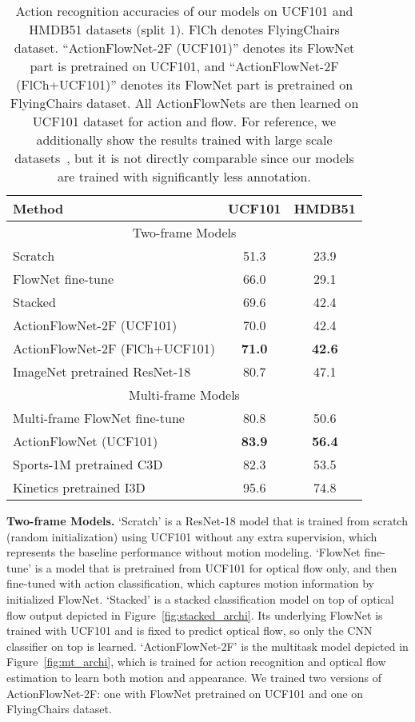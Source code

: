 \documentclass[10pt,twocolumn,letterpaper]{article}
\begin{document}
\begin{table}[h!]
\begin{center}{\small
    \begin{tabular}{l|c|c}
    \hline
    Method & UCF101 & HMDB51\\
    \hline\hline
      \multicolumn{3}{c}{Two-frame Models} \\
      \hline
    Scratch & 51.3 & 23.9 \\
    FlowNet fine-tune & 66.0 & 29.1 \\
    \hline
    Stacked & 69.6 & 42.4  \\
    ActionFlowNet-2F (UCF101)         & 70.0 & 42.4 \\
    ActionFlowNet-2F (FlCh+UCF101)  & \textbf{71.0} & \textbf{42.6}  \\
    \hline
    ImageNet pretrained ResNet-18 & 80.7 & 47.1\\

    \hline \hline
      \multicolumn{3}{c}{Multi-frame Models} \\
      \hline
    Multi-frame FlowNet fine-tune  & 80.8 & 50.6 \\
    ActionFlowNet (UCF101) & \textbf{83.9} & \textbf{56.4} \\
      \hline
    Sports-1M pretrained C3D~\cite{tranBFTP15} & 82.3 & 53.5\\
    Kinetics pretrained I3D~\cite{carreira2017quo} & 95.6 & 74.8\\
    \hline
    \end{tabular}
}
\end{center}
  \vspace{-1em}
  \caption{Action recognition accuracies of our models on UCF101 and HMDB51 datasets (split 1). FlCh denotes FlyingChairs dataset. ``ActionFlowNet-2F (UCF101)'' denotes its FlowNet part is pretrained on UCF101, and ``ActionFlowNet-2F (FlCh+UCF101)'' denotes its FlowNet part is pretrained on FlyingChairs dataset. All ActionFlowNets are then learned on UCF101 dataset for action and flow. For reference, we additionally show the results trained with large scale datasets~\cite{tranbftp16,carreira2017quo}, but it is not directly comparable since our models are trained with significantly less annotation.}
\label{tab:results}
\end{table}\textbf{Two-frame Models.}
`Scratch' is a ResNet-18 model that is trained from scratch (random initialization) using UCF101 without any extra supervision, which represents the baseline performance without motion modeling.
`FlowNet fine-tune' is a model that is pretrained from UCF101 for optical flow only, and then fine-tuned with action classification, which captures motion information by initialized FlowNet.
`Stacked' is a stacked classification model on top of optical flow output depicted in Figure~\ref{fig:stacked_archi}. Its underlying FlowNet is trained with UCF101 and is fixed to predict optical flow, so only the CNN classifier on top is learned.
`ActionFlowNet-2F' is the multitask model depicted in Figure~\ref{fig:mt_archi}, which is trained for action recognition and optical flow estimation to learn both motion and appearance.
We trained two versions of ActionFlowNet-2F: one with FlowNet pretrained on UCF101 and one on FlyingChairs dataset.
\end{document}
